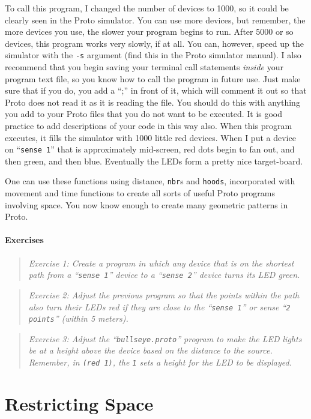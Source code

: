 \documentclass{article}
\newcommand\problem[1]{\begin{quote}{\em #1}\end{quote}}
\newcommand\var[1]{{\tt #1}}
\newcommand\qvar[1]{``{\tt #1}''}
\begin{document}
To call this program, I changed the number of devices to 1000, so it
could be clearly seen in the Proto simulator.  You can use more
devices, but remember, the more devices you use, the slower your
program begins to run.  After 5000 or so devices, this program works
very slowly, if at all.  You can, however, speed up the simulator with
the \var{-s} argument (find this in the Proto simulator manual).  I
also recommend that you begin saving your terminal call statements
{\em inside} your program text file, so you know how to call the
program in future use.  Just make sure that if you do, you add a “;”
in front of it, which will comment it out so that Proto does not read
it as it is reading the file.  You should do this with anything you
add to your Proto files that you do not want to be executed.  It is
good practice to add descriptions of your code in this way also.  When
this program executes, it fills the simulator with 1000 little red
devices.  When I put a device on \qvar{sense 1} that is approximately
mid-screen, red dots begin to fan out, and then green, and then blue.
Eventually the LEDs form a pretty nice target-board.

One can use these functions using distance, \var{nbr}s and
\var{hoods}, incorporated with movement and time functions to create
all sorts of useful Proto programs involving space.  You now know enough
to create many geometric patterns in Proto.

\paragraph{Exercises}

\problem{Exercise 1: Create a program in which any device that is on
  the shortest path from a \qvar{sense 1} device to a \qvar{sense 2}
  device turns its LED green.}

\problem{Exercise 2: Adjust the previous program so that the points
  within the path also turn their LEDs red if they are close to the
  \qvar{sense 1} or sense \qvar{2 points} (within 5 meters).}

\problem{Exercise 3: Adjust the \qvar{bullseye.proto} program to make
  the LED lights be at a height above the device based on the distance
  to the source. Remember, in \var{(red 1)}, the \var{1} sets a height
  for the LED to be displayed.}

\section{Restricting Space}
\label{s:mux}
\end{document}
